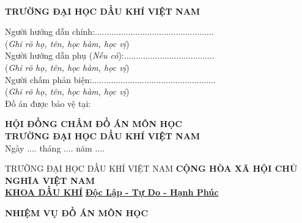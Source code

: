 \documentclass[12pt,a4paper]{report}
\begin{document}
\clearpage


\begin{center}
	\centering
	\\ 
	\textbf{TRƯỜNG ĐẠI HỌC DẦU KHÍ VIỆT NAM}
\end{center}
Người hướng dẫn chính:..................................................\\
(\textit{Ghi rõ họ, tên, học hàm, học vị})\\
\newline
Người hướng dẫn phụ (\textit{Nếu có}):......................................\\
(\textit{Ghi rõ họ, tên, học hàm, học vị})\\
\newline
Người chấm phản biện:....................................................\\
(\textit{Ghi rõ họ, tên, học hàm, học vị})\\
\newline
\newline
\newline
\newline
\newline
\newline
Đồ án được bảo vệ tại:
\begin{center}
	\centering
	\textbf{HỘI ĐỒNG CHẤM ĐỒ ÁN MÔN HỌC}\\
	\textbf{TRƯỜNG ĐẠI HỌC DẦU KHÍ VIỆT NAM}\\
	Ngày .... tháng .... năm ....
\end{center}
\newpage

\begingroup
\fontsize{10pt}{12pt}\selectfont
TRƯỜNG ĐẠI HỌC DẦU KHÍ VIỆT NAM \hspace*{1.5cm} \textbf{CỘNG HÒA XÃ HỘI CHỦ NGHĨA VIỆT NAM}\\
\hspace*{1.7cm}\underline{\textbf{KHOA DẦU KHÍ}} \hspace*{4.4cm} \underline{\textbf{Độc Lập - Tự Do - Hạnh Phúc}}
\endgroup

\begin{center}
	\centering
	\textbf{NHIỆM VỤ ĐỒ ÁN MÔN HỌC}
\end{center}
\end{document}
